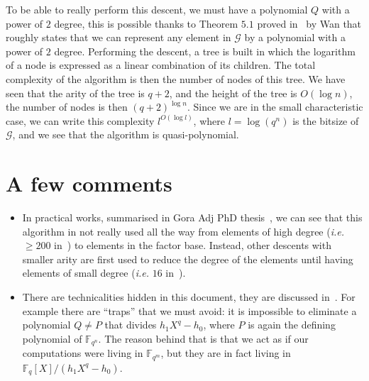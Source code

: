 \documentclass[a4paper,11pt]{article}
\theoremstyle{break}
\theoremstyle{sc}
\theoremstyle{definition}
\theoremstyle{remark}
\newcommand{\ie}{\emph{i.e. }}
\begin{document}
To be able to really perform this descent, we must have a polynomial $Q$ with a 
power of $2$ degree, this is possible thanks to Theorem $5.1$ proved 
in~\cite{Wan97} by Wan that roughly states that we can represent any element in
$\mathcal G$ by a polynomial with a power of $2$ degree. Performing the
descent, a tree is built in which the logarithm of a node is expressed
as a linear combination of its children. The total complexity of the algorithm
is then the number of nodes of this tree. We have seen that the arity of the
tree is $q+2$, and the height of the tree is $O(\log n)$, the number of nodes
is then $(q+2)^{\log n}$. Since we are in the small characteristic case, we
can write this complexity $l^{O(\log l)}$, where $l=\log(q^n)$ is the bitsize of
$\mathcal G$, and we see that the algorithm is quasi-polynomial.
\section{A few comments}

\begin{itemize}
  \item In practical works, summarised in Gora Adj PhD thesis~\cite{Adj16}, we
    can see that this algorithm in not really used all the way from elements
    of high degree (\ie $\geq 200$ in~\cite{Adj16}) to elements in the factor base. Instead, other descents
    with smaller arity are first used to reduce the degree of the elements
    until having elements of small degree (\ie $16$ in~\cite{Adj16}).
  \item There are technicalities hidden in this document, they are discussed
    in~\cite{GKZ14}. For example there are ``traps'' that we must avoid: it is
    impossible to eliminate a polynomial $Q\neq P$ that divides
    $h_1X^q-h_0$, where $P$ is again the defining polynomial of
    $\mathbb{F}_{q^n}$. The reason behind that is that we act as if our
    computations were living in $\mathbb{F}_{q^m}$, but they are in fact living
    in $\mathbb{F}_{q}[X]/(h_1X^q-h_0)$.
\end{itemize}

\clearpage


\end{document}
